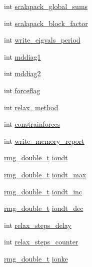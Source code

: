 \begin{DoxyCompactItemize}
\item 
int \hyperlink{struct_c_o_n_t_r_o_l_a7b91c878d089989a40f7919c9f4538ad}{scalapack\-\_\-global\-\_\-sums}
\item 
int \hyperlink{struct_c_o_n_t_r_o_l_a6f68feffcf9045d0dc105c16ee3068e2}{scalapack\-\_\-block\-\_\-factor}
\item 
int \hyperlink{struct_c_o_n_t_r_o_l_ae13a0218861de8b343072766618fcc05}{write\-\_\-eigvals\-\_\-period}
\item 
int \hyperlink{struct_c_o_n_t_r_o_l_aded114f42737b86283961dc865fd5aab}{mddiag1}
\item 
int \hyperlink{struct_c_o_n_t_r_o_l_abc0c2dec003c0b66ae034872d07ff929}{mddiag2}
\item 
int \hyperlink{struct_c_o_n_t_r_o_l_a7019425606b5da74910f42fa9d2fd13a}{forceflag}
\item 
int \hyperlink{struct_c_o_n_t_r_o_l_a2773b1c0c4b6f2980f25a83377dff166}{relax\-\_\-method}
\item 
int \hyperlink{struct_c_o_n_t_r_o_l_a2853f86a80212c60456ad6457e289025}{constrainforces}
\item 
int \hyperlink{struct_c_o_n_t_r_o_l_aa0478adaf3d86ad012b8d9a8f04c5d99}{write\-\_\-memory\-\_\-report}
\item 
\hyperlink{rmgtypes_8h_aaa16921c14f121c56eaa42390a340db8}{rmg\-\_\-double\-\_\-t} \hyperlink{struct_c_o_n_t_r_o_l_a7cd2512bfacfa961ec7cbd086768d742}{iondt}
\item 
\hyperlink{rmgtypes_8h_aaa16921c14f121c56eaa42390a340db8}{rmg\-\_\-double\-\_\-t} \hyperlink{struct_c_o_n_t_r_o_l_a8f9f532fcf3785c6d7c121fe94db58e8}{iondt\-\_\-max}
\item 
\hyperlink{rmgtypes_8h_aaa16921c14f121c56eaa42390a340db8}{rmg\-\_\-double\-\_\-t} \hyperlink{struct_c_o_n_t_r_o_l_a418f3fce6925ea2002691b2e47314140}{iondt\-\_\-inc}
\item 
\hyperlink{rmgtypes_8h_aaa16921c14f121c56eaa42390a340db8}{rmg\-\_\-double\-\_\-t} \hyperlink{struct_c_o_n_t_r_o_l_abba78052ad9698ed937f42a2aa65e922}{iondt\-\_\-dec}
\item 
int \hyperlink{struct_c_o_n_t_r_o_l_a4bbea92171645f18a7c17d342f6e4ba4}{relax\-\_\-steps\-\_\-delay}
\item 
int \hyperlink{struct_c_o_n_t_r_o_l_ad1e0e47a592859b56280ecda24fca7e1}{relax\-\_\-steps\-\_\-counter}
\item 
\hyperlink{rmgtypes_8h_aaa16921c14f121c56eaa42390a340db8}{rmg\-\_\-double\-\_\-t} \hyperlink{struct_c_o_n_t_r_o_l_ac0b05d44b7152ef08831ebe2851226aa}{ionke}
\item 

\end{DoxyCompactItemize}
